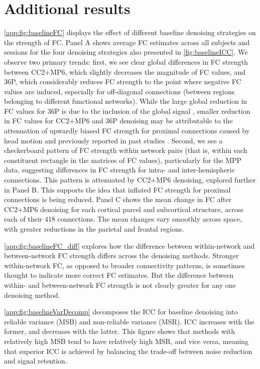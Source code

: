 \documentclass{article}
\begin{document}
\newpage
\section{Additional results}
\label{app:moreresults}

\autoref{app:fig:baselineFC} displays the effect of different baseline denoising strategies on the strength of FC. Panel A shows average FC estimates across all subjects and sessions for the four denoising strategies also presented in \autoref{fig:baselineICC}. We observe two primary trends: first, we see clear global differences in FC strength between CC2+MP6, which slightly decreases the magnitude of FC values, and 36P, which considerably reduces FC strength to the point where negative FC values are induced, especially for off-diagonal connections (between regions belonging to different functional networks). While the large global reduction in FC values for 36P is due to the inclusion of the global signal \citep{murphyImpactGlobalSignal2009}, smaller reduction in FC values for CC2+MP6 and 36P denoising may be attributable to the attenuation of upwardly biased FC strength for proximal connections caused by head motion and previously reported in past studies \citep{vandijkInfluenceHeadMotion2012, powerSpuriousSystematicCorrelations2012, satterthwaiteImpactInScannerHead2012}.
Second, we see a checkerboard pattern of FC strength within network pairs (that is, within each constituent rectangle in the matrices of FC values), particularly for the MPP data, suggesting differences in FC strength for intra- and inter-hemispheric connections. This pattern is attenuated by CC2+MP6 denoising, explored further in Panel B. This supports the idea that inflated FC strength for proximal connections is being reduced. Panel C shows the mean change in FC after CC2+MP6 denoising for each cortical parcel and subcortical structure, across each of their 418 connections. The mean changes vary smoothly across space, with greater reductions in the parietal and frontal regions.

\autoref{app:fig:baselineFC_diff} explores how the difference between within-network and between-network FC strength differs across the denoising methods. Stronger within-network FC, as opposed to broader connectivity patterns, is sometimes thought to indicate more correct FC estimates. But the difference between within- and between-network FC strength is not clearly greater for any one denoising method. 

\autoref{app:fig:baselineVarDecomp} decomposes the ICC for baseline denoising into reliable variance (MSB) and non-reliable variance (MSR). ICC increases with the former, and decreases with the latter. This figure shows that methods with relatively high MSB tend to have relatively high MSR, and vice versa, meaning that superior ICC is achieved by balancing the trade-off between noise reduction and signal retention. 
\end{document}
